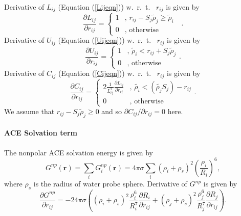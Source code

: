 \documentclass[12pt]{article}
\begin{document}
Derivative of $L_{ij}$ (Equation (\ref{Lijeqn})) w.~r.~t.~ $r_{ij}$ is given by
\begin{equation}
\frac{\partial L_{ij}}{\partial r_{ij}} = \left\{ \begin{array}{rl}
    1 &\mbox{, $r_{ij} - S_{j}\tilde{\rho}_{j} {\geq} \tilde{\rho}_{i}$ } \\
    0 &\mbox{, otherwise} 
    \end{array} \right..
\end{equation}
Derivative of $U_{ij}$ (Equation (\ref{Uijeqn})) w.~r.~t.~ $r_{ij}$ is given by
\begin{equation}
\frac{\partial U_{ij}}{\partial r_{ij}} = \left\{ \begin{array}{rl}
    1 &\mbox{, $\tilde{\rho}_{i} < r_{ij} + S_{j}\tilde{\rho}_{j}$} \\
    0 &\mbox{, otherwise}
    \end{array} \right..
\end{equation}
Derivative of $C_{ij}$ (Equation (\ref{Cijeqn})) w.~r.~t.~ $r_{ij}$ is given by
\begin{equation}
\frac{\partial C_{ij}}{\partial r_{ij}} = \left\{ \begin{array}{rl}
  2\frac{1}{L_{ij}^{2}}\frac{\partial L_{ij}}{\partial r_{ij}} &\mbox{, $\tilde{{\rho}_{i}} < ( \tilde{{\rho}_{j}}S_{j}) - r_{ij}$} \\
  0 &\mbox{, otherwise}
  \end{array} \right..
\end{equation}
We assume that $r_{ij} - S_{j}\tilde{\rho}_{j} {\geq} 0$ and so $\partial C_{ij}/\partial r_{ij}=0$ here.

\paragraph{ACE Solvation term}
The nonpolar ACE solvation energy is given by
\begin{equation}
\label{ACEsolvation}
G^{np}(\mathbf{r}) = \displaystyle\sum_{i}G_{i}^{np}(\mathbf{r}) = 4{\pi}{\sigma}\displaystyle\sum_{i}({\rho}_{i} + {\rho}_{s})^{2}\left(\frac{{\rho}_{i}}{R_{i}}\right)^{6},
\end{equation}
where ${\rho}_{s}$ is the radius of water probe sphere.
Derivative of $G^{np}$ is given by
\begin{equation}
\frac{\partial G^{np}}{\partial r_{ij}} = -24{\pi}{\sigma}\left( (\rho_{i} + \rho_{s})^{2}\frac{{\rho}_{i}^{6}}{R_{i}^{7}}\frac{\partial R_{i}}{\partial r_{ij}} + (\rho_{j} + \rho_{s})^{2}\frac{{\rho}_{j}^{6}}{R_{j}^{7}}\frac{\partial R_{j}}{\partial r_{ij}} \right).
\end{equation}
\end{document}
